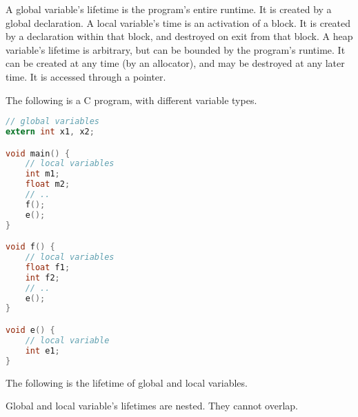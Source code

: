 \documentclass[a4paper, openany]{memoir}
\begin{document}
A global variable's lifetime is the program's entire runtime. It is created by a global declaration. A local variable's time is an activation of a block. It is created by a declaration within that block, and destroyed on exit from that block. A heap variable's lifetime is arbitrary, but can be bounded by the program's runtime. It can be created at any time (by an allocator), and may be destroyed at any later time. It is accessed through a pointer.

The following is a C program, with different variable types.
\begin{lstlisting}[language=C]
// global variables
extern int x1, x2;

void main() {
    // local variables
    int m1;
    float m2;
    // .. 
    f();
    e();
}

void f() {
    // local variables
    float f1;
    int f2;
    // ..
    e();
}

void e() {
    // local variable
    int e1;
}
\end{lstlisting}
The following is the lifetime of global and local variables.
\begin{figure}[H]
    \centering
\end{figure}
\noindent Global and local variable's lifetimes are nested. They cannot overlap.
\end{document}
